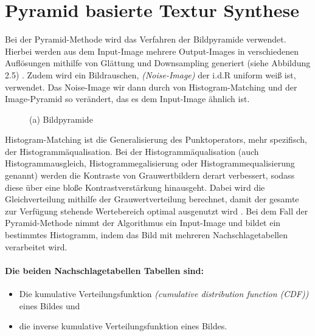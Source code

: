 \documentclass[12pt, a4paper,twoside,openany]{report} %
\begin{document}
\section{Pyramid basierte Textur Synthese}

Bei der Pyramid-Methode wird das Verfahren der Bildpyramide verwendet.
Hierbei werden aus dem Input-Image mehrere Output-Images in verschiedenen Auflösungen mithilfe von Glättung und Downsampling generiert {(siehe Abbildung 2.5)} \cite{Heeger}.
\newline
Zudem wird ein Bildrauschen, \textit{(Noise-Image)} der i.d.R uniform weiß ist, verwendet.
Das Noise-Image wir dann durch von Histogram-Matching und der Image-Pyramid so verändert, das es dem Input-Image ähnlich ist.

\begin{figure}[H]
    \centering
    \caption{(a) Bildpyramide}%
\end{figure}

Histogram-Matching ist die Generalisierung des Punktoperators, mehr spezifisch, der Histogrammäqualisation.
Bei der Histogrammäqualisation {(auch Histogrammausgleich, Histogrammegalisierung oder Histogrammequalisierung genannt)}
werden die Kontraste von Grauwertbildern derart verbessert, sodass diese über eine bloße Kontrastverstärkung hinausgeht.
Dabei wird die Gleichverteilung mithilfe der Grauwertverteilung berechnet, damit der gesamte zur Verfügung stehende Wertebereich optimal ausgenutzt wird \cite{Lehmann2013}.
Bei dem Fall der Pyramid-Methode nimmt der Algorithmus ein Input-Image und bildet ein bestimmtes Histogramm, indem das Bild mit mehreren Nachschlagetabellen verarbeitet wird.
\paragraph{Die beiden Nachschlagetabellen Tabellen sind:}
\begin{itemize}
    \itemsep-0.5em
    \item Die kumulative Verteilungsfunktion \textit{(cumulative distribution function (CDF))} eines Bildes und
    \item die inverse kumulative Verteilungsfunktion eines Bildes.
\end{itemize} 
\end{document}
